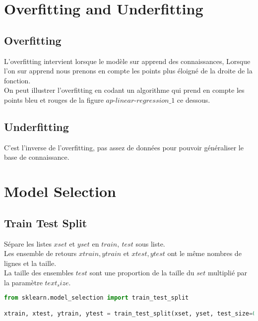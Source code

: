 \chapter{Overfitting and Underfitting}
\section{Overfitting}
L'overfitting intervient lorsque le modèle sur apprend des connaissances,
Lorsque l'on sur apprend nous prenons en compte les points plus éloigné de la droite de la fonction.\\
On peut illustrer l'overfitting en codant un algorithme qui prend en compte les points bleu et rouges de la figure $\textit{ap-linear-regression\_1}$ ce dessous.\\

\section{Underfitting}
C'est l'inverse de l'overfitting, pas assez de données pour pouvoir généraliser le base de connaissance.\\
\pagebreak

\chapter{Model Selection}
\pagebreak
\section{Train Test Split}

Sépare les listes $xset$ et $yset$ en $train,\ test$ sous liste.\\
Les ensemble de retours $xtrain,ytrain$ et $xtest,ytest$ ont le même nombres de lignes et la taille.\\
La taille des ensembles $test$ sont une proportion de la taille du $set$ multiplié par la paramètre $text_size$.\\

\lstset{style=mlpythoncode}
\begin{lstlisting}[language=Python]
from sklearn.model_selection import train_test_split

xtrain, xtest, ytrain, ytest = train_test_split(xset, yset, test_size=0.1, random_state=0)
\end{lstlisting}

\pagebreak
